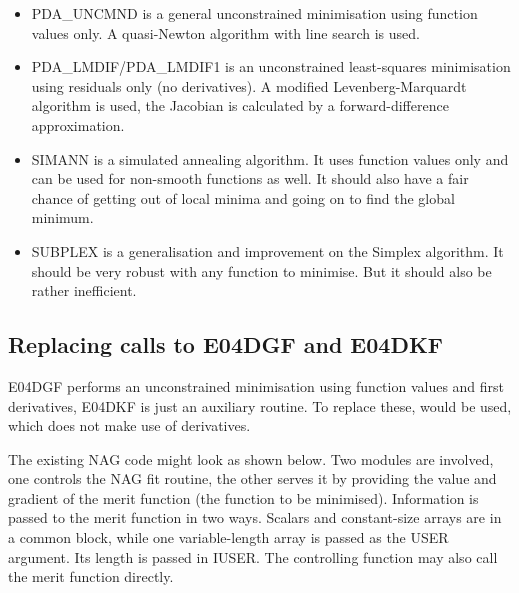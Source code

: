 \begin{itemize}
\item 
   PDA\_UNCMND is a general unconstrained minimisation using function values
   only. A quasi-Newton algorithm with line search is used.
\item 
   PDA\_LMDIF/PDA\_LMDIF1 is an unconstrained least-squares minimisation using
   residuals only (no derivatives).
   A modified Levenberg-Marquardt algorithm is used, the Jacobian is
   calculated by a forward-difference approximation.
\item 
   SIMANN is a simulated annealing algorithm. It uses function values
   only and can be used for non-smooth functions as well. It should also
   have a fair chance of getting out of local minima and going on to
   find the global minimum.
\item 
   SUBPLEX is a generalisation and improvement on the Simplex algorithm.
   It should be very robust with any function to minimise. But it should
   also be rather inefficient.
\end{itemize}


\subsection{Replacing calls to E04DGF and E04DKF}

   E04DGF performs an unconstrained minimisation using function
   values and first derivatives, E04DKF is just an auxiliary routine. To
   replace these,
   would be used, which does not make use of
   derivatives.

   The existing NAG code might look as shown below. Two modules are
   involved, one controls the NAG fit routine, the other serves it by
   providing the value and gradient of the merit function (the function
   to be minimised). Information is passed to the merit function in two
   ways. Scalars and constant-size arrays are in a common block, while
   one variable-length array is passed as the USER argument. Its length
   is passed in IUSER. The controlling function may also call the merit
   function directly.

